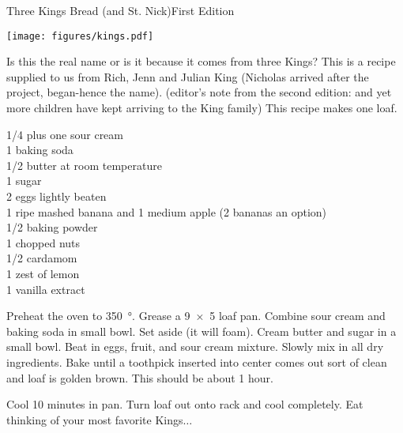 \begin{entry}{Three Kings Bread (and St. Nick)}{First Edition}

\begin{center}
    \texttt{[image: figures/kings.pdf]}
\end{center}

\begin{open}
  Is this the real name or is it because it comes from three Kings?
  This is a recipe supplied to us from Rich, Jenn and Julian King (Nicholas arrived after the project, began-hence the name). (editor's note from the second edition: and yet more children have kept arriving to the King family)
  This recipe makes one loaf.
\end{open}
\begin{ingredients}
  \SI{1/4}{\cup} plus one \si{\tblspoon} sour cream \\
  \SI{1}{\teaspoon} baking soda \\
  \SI{1/2}{\cup} butter at room temperature \\
  \SI{1}{\cup} sugar \\
  2 eggs lightly beaten \\
  1 ripe mashed banana and 1 medium apple (2 bananas an option) \\
  \SI{1/2}{\teaspoon} baking powder \\
  \SI{1}{\cup} chopped nuts \\
  \SI{1/2}{\teaspoon} cardamom \\
  1 zest of lemon \\
  \SI{1}{\teaspoon} vanilla extract
\end{ingredients}
Preheat the oven to \SI{350}{\degree}.  Grease a \SI{9x5}{\inch} loaf pan.
Combine sour cream and baking soda in small bowl.  Set aside (it will foam).
Cream butter and sugar in a small bowl.  Beat in eggs, fruit, and sour cream
mixture.  Slowly mix in all dry ingredients.  Bake until a toothpick inserted
into center comes out sort of clean and loaf is golden brown.  This should be
about 1 hour.

Cool 10 minutes in pan. Turn loaf out onto rack and cool completely.  Eat
thinking of your most favorite Kings$\ldots$
\end{entry}

